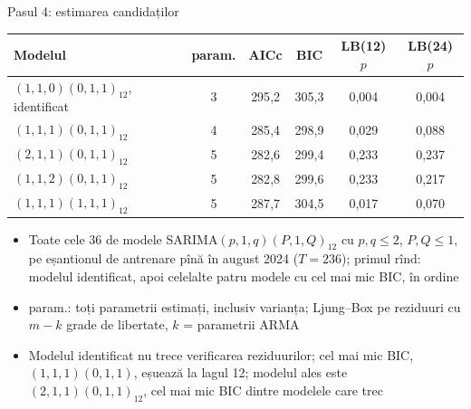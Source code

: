 \begin{frame}{Pasul 4: estimarea candidaților}
\itemsize{\footnotesize}
\begin{center}
\footnotesize
\begin{tabular}{lccccc}
\toprule
\textbf{Modelul} & param. & AICc & BIC & LB(12) $p$ & LB(24) $p$ \\
\midrule
$(1,1,0)(0,1,1)_{12}$, identificat & 3 & 295{,}2 & 305{,}3 & 0{,}004 & 0{,}004 \\
${(1,1,1)(0,1,1)}_{12}$ & 4 & 285{,}4 & 298{,}9 & 0{,}029 & 0{,}088 \\
${(2,1,1)(0,1,1)}_{12}$ & 5 & 282{,}6 & 299{,}4 & 0{,}233 & 0{,}237 \\
${(1,1,2)(0,1,1)}_{12}$ & 5 & 282{,}8 & 299{,}6 & 0{,}233 & 0{,}217 \\
${(1,1,1)(1,1,1)}_{12}$ & 5 & 287{,}7 & 304{,}5 & 0{,}017 & 0{,}070 \\
\bottomrule
\end{tabular}
\end{center}
\begin{itemize}
    \item Toate cele 36 de modele SARIMA$(p,1,q)(P,1,Q)_{12}$ cu $p, q \le 2$, $P, Q \le 1$, pe eșantionul de antrenare pînă în august 2024 ($T = 236$); primul rînd: modelul identificat, apoi celelalte patru modele cu cel mai mic BIC, în ordine
    \item param.: toți parametrii estimați, inclusiv varianța; Ljung--Box pe reziduuri cu $m - k$ grade de libertate, $k$ = parametrii ARMA
    \item Modelul identificat nu trece verificarea reziduurilor; cel mai mic BIC, $(1,1,1)(0,1,1)$, eșuează la lagul 12; modelul ales este $(2,1,1)(0,1,1)_{12}$, cel mai mic BIC dintre modelele care trec
\end{itemize}
\end{frame}

